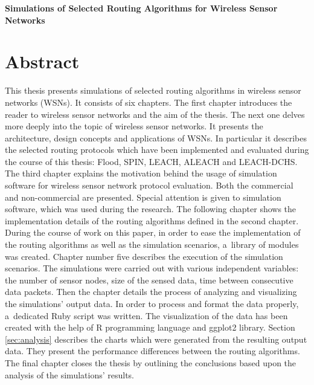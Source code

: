 \vskip 2cm


\begin{center}
\large \bf
Simulations of Selected Routing Algorithms for Wireless Sensor Networks 
\end{center}

\section*{Abstract}
This thesis presents simulations of selected routing algorithms in wireless sensor networks (WSNs). It consists of six chapters. The first chapter introduces the reader to wireless sensor networks and the aim of the thesis. The next one delves more deeply into the topic of wireless sensor networks. It presents the architecture, design concepts and applications of WSNs. In particular it describes the selected routing protocols which have been implemented and evaluated during the course of this thesis: Flood, SPIN, LEACH, ALEACH and LEACH-DCHS. The third chapter explains the motivation behind the usage of simulation software for wireless sensor network protocol evaluation. Both the commercial and non-commercial are presented. Special attention is given to \omnetpp simulation software, which was used during the research. The following chapter shows the implementation details of the routing algorithms defined in the second chapter. During the course of work on this paper, in order to ease the implementation of the routing algorithms as well as the simulation scenarios, a~library of \omnetpp modules was created. Chapter number five describes the execution of the simulation scenarios. The simulations were carried out with various independent variables: the number of sensor nodes, size of the sensed data, time between consecutive data packets. Then the chapter details the process of analyzing and visualizing the simulations' output data. In order to process and format the data properly, a~dedicated Ruby script was written. The visualization of the data has been created with the help of R programming language and ggplot2 library. Section \ref{sec:analysis} describes the charts which were generated from the resulting output data. They present the performance differences between the routing algorithms. The final chapter closes the thesis by outlining the conclusions based upon the analysis of the simulations' results.    

\vfill